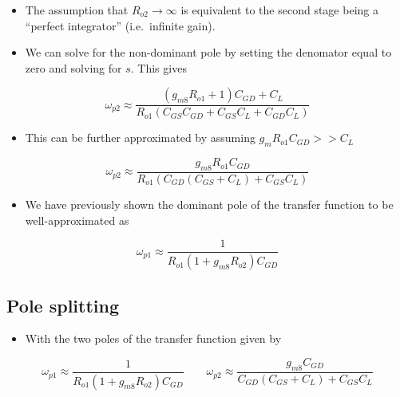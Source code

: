 \documentclass[11pt]{article}
\providecommand{\tightlist}{%
      \setlength{\itemsep}{0pt}\setlength{\parskip}{0pt}}
\begin{document}
\begin{itemize}
\tightlist
\item
  The assumption that \(R_{o2} \rightarrow \infty\) is equivalent to the
  second stage being a ``perfect integrator'' (i.e.~infinite gain).
\end{itemize}

    \begin{itemize}
\tightlist
\item
  We can solve for the non-dominant pole by setting the denomator equal
  to zero and solving for \(s\). This gives
\end{itemize}

\begin{equation}
\omega_{p2} \approx \dfrac{(g_{m8}R_{o1}+1)C_{GD}+C_L}{R_{o1}(C_{GS}C_{GD}+C_{GS}C_L+C_{GD}C_L)
}\end{equation}

\begin{itemize}
\tightlist
\item
  This can be further approximated by assuming
  \(g_{m}R_{o1}C_{GD} >> C_L\)
\end{itemize}

\begin{equation}
\omega_{p2} \approx \dfrac{g_{m8}R_{o1}C_{GD}}{R_{o1}(C_{GD}(C_{GS}+C_L)+C_{GS}C_L)
}\end{equation}

\begin{itemize}
\tightlist
\item
  We have previously shown the dominant pole of the transfer function to
  be well-approximated as
\end{itemize}

\begin{equation}
\omega_{p1} \approx \dfrac{1}{R_{o1}(1+g_{m8} R_{o2})C_{GD}}
\end{equation}

    \hypertarget{pole-splitting}{%
\subsection{Pole splitting}\label{pole-splitting}}

    \begin{itemize}
\tightlist
\item
  With the two poles of the transfer function given by
\end{itemize}

\begin{equation}
\omega_{p1} \approx \dfrac{1}{R_{o1}(1+g_{m8} R_{o2})C_{GD}} \:\:\:\:\:\:\:\:\: \omega_{p2} \approx \dfrac{g_{m8}C_{GD}}{C_{GD}(C_{GS}+C_L)+C_{GS}C_L}
\end{equation}
\end{document}
